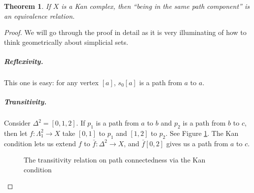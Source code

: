 \documentclass[12pt]{article}
\theoremstyle{plain}
\newtheorem{theorem}{Theorem}[section]
\theoremstyle{definition}
\begin{document}
\begin{theorem}
If $X$ is a Kan complex, then ``being in the same path component'' is an equivalence relation.
\end{theorem}
\begin{proof}
We will go through the proof in detail as it is very illuminating of how to think geometrically about simplicial sets.

\subparagraph{Reflexivity.} This one is easy: for any vertex $[a]$, $s_0[a]$ is a path from $a$ to $a$. 


\subparagraph{Transitivity.} Consider $\Delta^2=[0,1,2]$. If $p_1$ is a path from $a$ to $b$ and $p_2$ is a path from $b$ to $c$, then let $f\colon\Lambda_1^2\to X$ take $[0,1]$ to $p_1$ and $[1,2]$ to $p_2$. See Figure \ref{F: fig20a}. The Kan condition lets us extend $f$ to $\bar f\colon\Delta^2 \to X$, and $\bar f[0,2]$ gives us a path from $a$ to $c$.  

\begin{figure}[!htp]
\begin{center}
\end{center}
\caption{The transitivity relation on path connectedness via the Kan condition}\label{F: fig20a}
\end{figure}


\end{proof}
\end{document}
